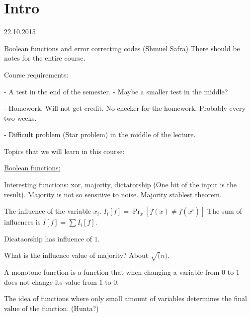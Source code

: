 \part{Intro}

22.10.2015

Boolean functions and error correcting codes (Shmuel Safra)
There should be notes for the entire course.

Course requirements:

- A test in the end of the semester.
  - Maybe a smaller test in the middle?

- Homework. Will not get credit. No checker for the homework.
  Probably every two weeks.

- Difficult problem (Star problem) in the middle of the lecture.

Topics that we will learn in this course:

\begin{enumerate}
  \item ECC (Error correccting codes)
  \item Boolean functions  $f: (\{0,1\}}^n \rightarrow \{0,1\)$
  \item Learning (Finding things about Boolean functions quickly).
  \item Cryptography
  \item Hardness of approximation
\end{enumerate}

\uline{Boolean functions:}

Interesting functions: xor, majority, dictatorship (One bit of the input
is the result). Majority is not so sensitive to noise. Majority stablest
theorem.

\begin{defn}
The influence of the variable $x_i$.
$I_i[f] = {\Pr}_x\left[{f(x) \neq f(x^i)}\right]$
The sum of influences is $I[f] = \sum{I_i[f]}$.
\end{defn}

Dicataorship has influence of $1$.

What is the influence value of majority? About $\sqrt(n)$.

\begin{defn}
A monotone function is a function that when changing a variable from $0$ to $1$
does not change its value from $1$ to $0$.
\end{defn}

The idea of functions where only small amount of variables determines the final
value of the function. (Hunta?)

